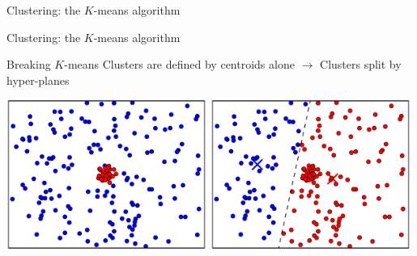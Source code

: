 \documentclass[compress,t]{beamer}
\begin{document}
\begin{frame}{Clustering: the $K$-means algorithm}
\begin{center}
  \end{center}
\end{frame}

\begin{frame}{Clustering: the $K$-means algorithm}
\end{frame}

\begin{frame}{Breaking $K$-means}
  Clusters are defined by \alert{centroids alone} $\longrightarrow$
  Clusters split by hyper-planes
  \begin{center}
    \includegraphics[width=0.49\textwidth]{break1-12}
    \includegraphics[width=0.49\textwidth]{break1-11}
  \end{center}
\end{frame}
\end{document}
